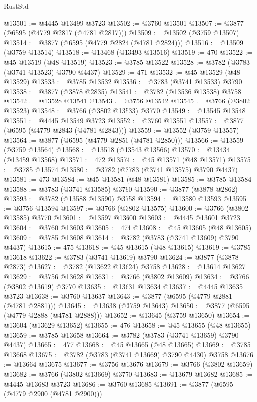 \begin{lexlean}{RustStd}
\begin{coremodule}
@13501 := @4445 @13499 @3723
@13502 := @3760 @13501
@13507 := @3877 (@6595 (@4779 @2817 (@4781 @2817)))
@13509 := @13502 (@3759 @13507)
@13514 := @3877 (@6595 (@4779 @2824 (@4781 @2824)))
@13516 := @13509 (@3759 @13514)
@13518 := @13468 (@13493 @13516)
@13519 := 470
@13522 := @45 @13519 (@48 @13519)
@13523 := @3785 @13522
@13528 := @3782 (@3783 (@3741 @13523) @3790 @4437)
@13529 := 471
@13532 := @45 @13529 (@48 @13529)
@13533 := @3785 @13532
@13536 := @3783 (@3741 @13533) @3790
@13538 := @3877 (@3878 @2835)
@13541 := @3782 (@13536 @13538) @3758
@13542 := @13528 @13541
@13543 := @3756 @13542
@13545 := @3766 (@3802 @13523)
@13548 := @3766 (@3802 @13533) @3770
@13549 := @13545 @13548
@13551 := @4445 @13549 @3723
@13552 := @3760 @13551
@13557 := @3877 (@6595 (@4779 @2843 (@4781 @2843)))
@13559 := @13552 (@3759 @13557)
@13564 := @3877 (@6595 (@4779 @2850 (@4781 @2850)))
@13566 := @13559 (@3759 @13564)
@13568 := @13518 (@13543 @13566)
@13570 := @13434 (@13459 @13568)
@13571 := 472
@13574 := @45 @13571 (@48 @13571)
@13575 := @3785 @13574
@13580 := @3782 (@3783 (@3741 @13575) @3790 @4437)
@13581 := 473
@13584 := @45 @13581 (@48 @13581)
@13585 := @3785 @13584
@13588 := @3783 (@3741 @13585) @3790
@13590 := @3877 (@3878 @2862)
@13593 := @3782 (@13588 @13590) @3758
@13594 := @13580 @13593
@13595 := @3756 @13594
@13597 := @3766 (@3802 @13575)
@13600 := @3766 (@3802 @13585) @3770
@13601 := @13597 @13600
@13603 := @4445 @13601 @3723
@13604 := @3760 @13603
@13605 := 474
@13608 := @45 @13605 (@48 @13605)
@13609 := @3785 @13608
@13614 := @3782 (@3783 (@3741 @13609) @3790 @4437)
@13615 := 475
@13618 := @45 @13615 (@48 @13615)
@13619 := @3785 @13618
@13622 := @3783 (@3741 @13619) @3790
@13624 := @3877 (@3878 @2873)
@13627 := @3782 (@13622 @13624) @3758
@13628 := @13614 @13627
@13629 := @3756 @13628
@13631 := @3766 (@3802 @13609)
@13634 := @3766 (@3802 @13619) @3770
@13635 := @13631 @13634
@13637 := @4445 @13635 @3723
@13638 := @3760 @13637
@13643 := @3877 (@6595 (@4779 @2881 (@4781 @2881)))
@13645 := @13638 (@3759 @13643)
@13650 := @3877 (@6595 (@4779 @2888 (@4781 @2888)))
@13652 := @13645 (@3759 @13650)
@13654 := @13604 (@13629 @13652)
@13655 := 476
@13658 := @45 @13655 (@48 @13655)
@13659 := @3785 @13658
@13664 := @3782 (@3783 (@3741 @13659) @3790 @4437)
@13665 := 477
@13668 := @45 @13665 (@48 @13665)
@13669 := @3785 @13668
@13675 := @3782 (@3783 (@3741 @13669) @3790 @4430) @3758
@13676 := @13664 @13675
@13677 := @3756 @13676
@13679 := @3766 (@3802 @13659)
@13682 := @3766 (@3802 @13669) @3770
@13683 := @13679 @13682
@13685 := @4445 @13683 @3723
@13686 := @3760 @13685
@13691 := @3877 (@6595 (@4779 @2900 (@4781 @2900)))

\end{coremodule}
\end{lexlean}
